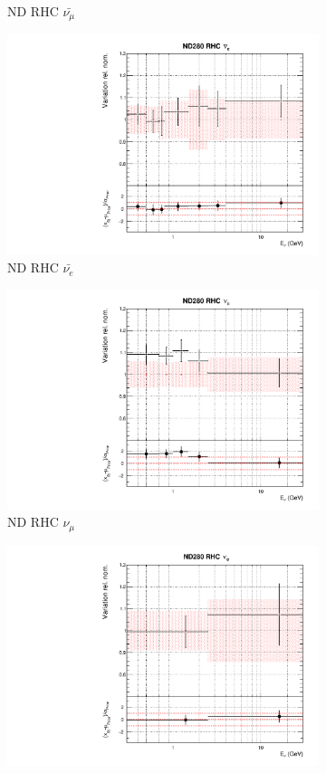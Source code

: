 \begin{figure}
\begin{subfigure}{0.24\textwidth}
  \caption{ND RHC $\bar{\nu_{\mu}}$}
\end{subfigure}
\begin{subfigure}{0.24\textwidth}
  \centering
  \includegraphics[width=0.95\linewidth]{figs/datflux5}
  \caption{ND RHC $\bar{\nu_{e}}$}
\end{subfigure}
\begin{subfigure}{0.24\textwidth}
  \centering
  \includegraphics[width=0.95\linewidth]{figs/datflux6}
  \caption{ND RHC $\nu_{\mu}$}
\end{subfigure}
\vspace{15mm}
\begin{subfigure}{0.24\textwidth}
  \centering
  \includegraphics[width=0.95\linewidth]{figs/datflux7}

\end{subfigure}
\end{figure}
